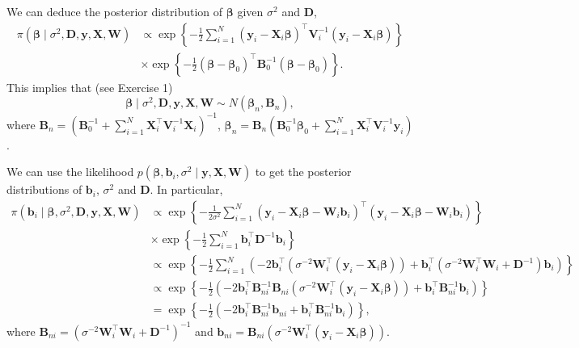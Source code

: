 We can deduce the posterior distribution of $\bm{\beta}$ given $\sigma^2$ and $\bm{D}$,
\begin{align*}
	\pi(\bm{\beta}\mid \sigma^2, \bm{D},\bm{y}, \bm{X}, \bm{W}) & \propto \exp\left\{-\frac{1}{2}\sum_{i=1}^N(\bm{y}_i-\bm{X}_i\bm{\beta})^{\top}\bm{V}_i^{-1}(\bm{y}_i-\bm{X}_i\bm{\beta})\right\}\\
	&\times \exp\left\{-\frac{1}{2}(\bm{\beta}-\bm{\beta}_0)^{\top}\bm{B}_0^{-1}(\bm{\beta}-\bm{\beta}_0)\right\}.
\end{align*} 
This implies that (see Exercise 1)  
\begin{equation*}
	\bm{\beta}\mid \sigma^2,\bm{D},\bm{y}, \bm{X}, \bm{W} \sim {N}(\bm{\beta}_n,\bm{B}_n), 
\end{equation*}
where $\bm{B}_n = (\bm{B}_0^{-1} +\sum_{i=1}^N \bm{X}_i^{\top}\bm{V}_i^{-1}\bm{X}_i)^{-1}$, $\bm{\beta}_n= \bm{B}_n(\bm{B}_0^{-1}\bm{\beta}_0 + \sum_{i=1}^N\bm{X}_i^{\top}\bm{V}_i^{-1}\bm{y}_i)$.

We can use the likelihood $p(\bm{\beta},\bm{b}_i,\sigma^2\mid \bm{y}, \bm{X},\bm{W})$ to get the posterior distributions of $\bm{b}_i$, $\sigma^2$ and $\bm{D}$. In particular,
\begin{align*}
	\pi(\bm{b}_i\mid \bm{\beta},\sigma^2,\bm{D},\bm{y}, \bm{X}, \bm{W})&\propto \exp\left\{-\frac{1}{2\sigma^2}\sum_{i=1}^N(\bm{y}_i-\bm{X}_i\bm{\beta}-\bm{W}_i\bm{b}_i)^{\top}(\bm{y}_i-\bm{X}_i\bm{\beta}-\bm{W}_i\bm{b}_i)\right\}\\
	&\times \exp\left\{-\frac{1}{2}\sum_{i=1}^N \bm{b}_i^{\top}\bm{D}^{-1}\bm{b}_i\right\}\\
	&\propto\exp\left\{-\frac{1}{2}\sum_{i=1}^N(-2\bm{b}_i^{\top}(\sigma^{-2}\bm{W}_i^{\top}(\bm{y}_i-\bm{X}_i\bm{\beta}))+ \bm{b}_i^{\top}(\sigma^{-2}\bm{W}_i^{\top}\bm{W}_i+\bm{D}^{-1})\bm{b}_i)\right\}\\
	&\propto\exp\left\{-\frac{1}{2}(-2\bm{b}_i^{\top}\bm{B}_{ni}^{-1}\bm{B}_{ni}(\sigma^{-2}\bm{W}_i^{\top}(\bm{y}_i-\bm{X}_i\bm{\beta}))+ \bm{b}_i^{\top}\bm{B}_{ni}^{-1}\bm{b}_i)\right\}\\
	&=\exp\left\{-\frac{1}{2}(-2\bm{b}_i^{\top}\bm{B}_{ni}^{-1}\bm{b}_{ni}+ \bm{b}_i^{\top}\bm{B}_{ni}^{-1}\bm{b}_i)\right\}, 
\end{align*}
where $\bm{B}_{ni}=(\sigma^{-2}\bm{W}_i^{\top}\bm{W}_i+\bm{D}^{-1})^{-1}$ and $\bm{b}_{ni}=\bm{B}_{ni}(\sigma^{-2}\bm{W}_i^{\top}(\bm{y}_i-\bm{X}_i\bm{\beta}))$.

